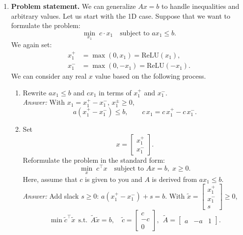 \documentclass[11pt]{article}
\begin{document}
\begin{enumerate}[label=\textbf{2(\alph*)}]
	\item \textbf{Problem statement.}  
	We can generalize $Ax = b$ to handle inequalities and arbitrary values. Let
	us start with the 1D case. Suppose that we want to formulate the problem:
	\begin{equation}
		\min_{x_1}\; c \cdot x_1 \quad \text{subject to } a x_1 \leq b.
		\label{eq:ineq_obj}
	\end{equation}
	We again set:
	\begin{align}
		x_1^{+} &= \max(0, x_1) = \mathrm{ReLU}(x_1), \label{eq:relu2_pos} \\
		x_1^{-} &= \max(0, -x_1) = \mathrm{ReLU}(-x_1). \label{eq:relu2_neg}
	\end{align}
	We can consider any real $x$ value based on the following process.
	\begin{enumerate}[label=\roman*)]
		\item Rewrite $ax_1 \leq b$ and $c x_1$ in terms of $x_1^{+}$ and $x_1^{-}$.\\
		\emph{Answer:} With $x_1=x_1^+-x_1^-$, $x_1^\pm\ge 0$,
		\[
		a(x_1^+-x_1^-)\le b,\qquad c\,x_1=c\,x_1^+-c\,x_1^-.
		\]
		
		\item Set
		\[
		x = \begin{bmatrix} x_1^{+} \\ x_1^{-} \end{bmatrix}.
		\]
		Reformulate the problem in the standard form:
		\begin{equation}
			\min_{x}\; c^{\top}x \quad \text{subject to } Ax = b, \; x \geq 0.
			\label{eq:stdform_ineq}
		\end{equation}
		Here, assume that $c$ is given to you and $A$ is derived from $ax_1 \leq b$.\\
		\emph{Answer:} Add slack $s\ge 0$: $a(x_1^+-x_1^-)+s=b$.  
		With $\tilde x=\begin{bmatrix}x_1^+\\x_1^-\\s\end{bmatrix}\!\ge 0$,
		\[
		\min \tilde c^\top \tilde x\ \ \text{s.t.}\ \ \tilde A\tilde x=b,\quad
		\tilde c=\begin{bmatrix}c\\-c\\0\end{bmatrix},\ \
		\tilde A=\begin{bmatrix}a&-a&1\end{bmatrix}.
		\]
		

\end{enumerate}
\end{enumerate}
\end{document}
